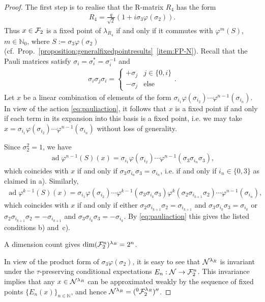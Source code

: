 \documentclass[12pt,a4paper]{amsart}
\numberwithin{equation}{section}
\theoremstyle{remark}
\def\dim{\operatorname{dim}}
\DeclareMathOperator{\ad}{ad}
\def\N{\mathbb{N}}
\newcommand{\la}{\lambda}
\begin{document}
\begin{proof}
  The first step is to realise that the R-matrix $R_4$ has the form 
  \begin{align*}
   R_4=\frac{q}{\sqrt{2}}(1+i\sigma_3\varphi(\sigma_2)).
  \end{align*}
  Thus $x\in\mathcal{F}_2$ is a fixed point of $\la_{R_4}$ if and only if it commutes with $\varphi^m(S)$, $m\in\N_0$, where $S:=\sigma_3\varphi(\sigma_2)$ (cf.~Prop.~\ref{proposition:generalfixedpointresults}~\ref{item:FP-N}). Recall that the Pauli matrices satisfy $\sigma_i=\sigma_i^*=\sigma_i^{-1}$ and
  \begin{align}\label{eq:pauliaction}
   \sigma_i\sigma_j\sigma_i=\begin{cases}
                               +\sigma_j & j\in\{0,i\}\\
                               -\sigma_j & \text{else}
                              \end{cases}.
  \end{align}
  Let $x$ be a linear combination of elements of the form $\sigma_{i_1}\varphi(\sigma_{i_2})\cdots\varphi^{n-1}(\sigma_{i_n})$. In view of the action \eqref{eq:pauliaction}, it follows that $x$ is a fixed point if and only if each term in its expansion into this basis is a fixed point, i.e. we may take $x=\sigma_{i_1}\varphi(\sigma_{i_2})\cdots\varphi^{n-1}(\sigma_{i_n})$ without loss of generality. 
  
  Since $\sigma_2^2=1$, we have
  \begin{align*}
   \ad \varphi^{n-1}(S)(x)=\sigma_{i_1}\varphi(\sigma_{i_2})\cdots\varphi^{n-1}(\sigma_3\sigma_{i_n}\sigma_3),
  \end{align*}
  which coincides with $x$ if and only if $\sigma_3\sigma_{i_n}\sigma_3=\sigma_{i_n}$, i.e. if and only if $i_n\in\{0,3\}$ as claimed in a). Similarly, 
  \begin{align*}
   \ad \varphi^{k-1}(S)(x)
   =
   \sigma_{i_1}\varphi(\sigma_{i_2})\cdots\varphi^{k-1}(\sigma_3\sigma_{i_{k}}\sigma_3)\varphi^k(\sigma_2\sigma_{i_{k+1}}\sigma_2)
   \cdots\varphi^{n-1}(\sigma_{i_n}),
  \end{align*}
  which coincides with $x$ if and only if either $\sigma_2\sigma_{i_{k+1}}\sigma_2=\sigma_{i_{k+1}}$ and $\sigma_3\sigma_{i_{k}}\sigma_3=\sigma_{i_{k}}$ or $\sigma_2\sigma_{i_{k+1}}\sigma_2=-\sigma_{i_{k+1}}$ and $\sigma_3\sigma_{i_{k}}\sigma_3=-\sigma_{i_{k}}$. By \eqref{eq:pauliaction} this gives the listed conditions b) and~c).
  
  A dimension count gives $\dim(\CF_2^n)^{\la_R}=2^n$. 
  
  In view of the product form of $\sigma_3\varphi(\sigma_2)$, it is easy to see that $\CN^{\la_R}$ is invariant under the $\tau$-preserving conditional expectations $E_n:\mathcal{N}\to\mathcal{F}_2^n$. This invariance implies that any $x\in\mathcal{N}^{\lambda_R}$ can be approximated weakly by the sequence of fixed points $\{E_n(x)\}_{n\in\N}$, and hence $\CN^{\la_R}=({}^0\CF_2^{\la_R})''$.
\end{proof}
\end{document}
